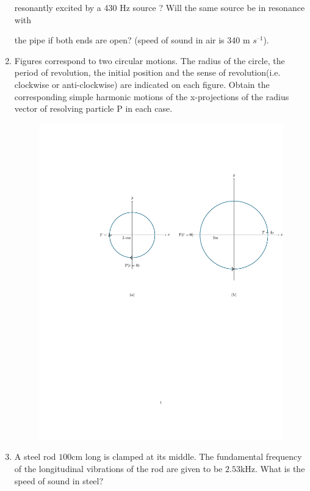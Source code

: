 \begin{enumerate}[label=\thesection.\arabic*,ref=\thesection.\theenumi]
resonantly excited by a 430 Hz source ? Will the same source be in resonance with

the pipe if both ends are open? (speed of sound in air is 340 m $s^{–1}$).\\
\solution
\pagebreak

\item Figures correspond to two circular motions. The radius of the circle, the period of revolution, the initial position and the sense of revolution(i.e. clockwise or anti-clockwise) are indicated on each figure. Obtain the corresponding simple harmonic motions of the x-projections of the radius vector of resolving particle P in each case.

\begin{figure}[H]
    \centering
    \includegraphics[width=\textwidth]{ncert-physics/11/14/11/codes/qfig.pdf}
\end{figure}
\solution
\pagebreak

\item A steel rod $100$cm long is clamped at its middle. The fundamental frequency of the longitudinal vibrations of the rod are given to be $2.53$kHz. What is the speed of sound in steel? \\
\solution
\pagebreak


\end{enumerate}
